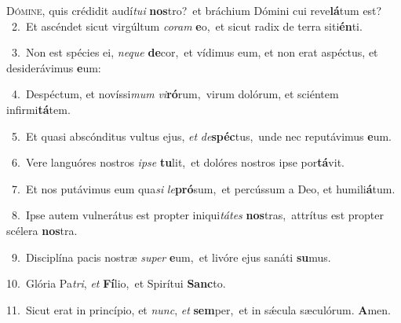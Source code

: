 \lettrine{\initial\textcolor{\initialcolor}{D}}{ómine,} quis crédidit audí\-\textit{tu}\-\textit{i} \textbf{nos}\-tro?~\star et bráchium Dómini cui reve\-\textbf{lá}\-tum est?\\
{\numbfont\textcolor{\numbcolor}{~2.}}~Et ascéndet sicut virgúltum \textit{co}\-\textit{ram} \textbf{e}\-o,~\star et sicut radix de terra siti\-\textbf{én}\-ti.\par
{\numbfont\textcolor{\numbcolor}{~3.}}~Non est spécies ei, \textit{ne}\-\textit{que} \textbf{de}\-cor,~\star et vídimus eum, et non erat aspéctus, et desiderávimus \textbf{e}\-um:\par
{\numbfont\textcolor{\numbcolor}{~4.}}~Despéctum, et novíssi\textit{mum} \textit{vi}\-\textbf{ró}rum,~\star virum dolórum, et sciéntem infirmi\-\textbf{tá}\-tem.\par
{\numbfont\textcolor{\numbcolor}{~5.}}~Et quasi abscónditus vultus ejus, \textit{et} \textit{de}\-\textbf{spéc}tus,~\star unde nec reputávimus \textbf{e}\-um.\par
{\numbfont\textcolor{\numbcolor}{~6.}}~Vere languóres nostros \textit{ip}\-\textit{se} \textbf{tu}\-lit,~\star et dolóres nostros ipse por\-\textbf{tá}\-vit.\par
{\numbfont\textcolor{\numbcolor}{~7.}}~Et nos putávimus eum qua\textit{si} \textit{le}\-\textbf{pró}sum,~\star et percússum a Deo, et humili\-\textbf{á}\-tum.\par
{\numbfont\textcolor{\numbcolor}{~8.}}~Ipse autem vulnerátus est propter iniqui\-\textit{tá}\-\textit{tes} \textbf{nos}\-tras,~\star attrítus est propter scélera \textbf{nos}\-tra.\par
{\numbfont\textcolor{\numbcolor}{~9.}}~Disciplína pacis nostræ \textit{su}\-\textit{per} \textbf{e}\-um,~\star et livóre ejus sanáti \textbf{su}\-mus.\par
{\numbfont\textcolor{\numbcolor}{10.}}~Glória Pa\-\textit{tri}\-, \textit{et} \textbf{Fí}\-lio,~\star et Spirítui \textbf{Sanc}\-to.\par
{\numbfont\textcolor{\numbcolor}{11.}}~Sicut erat in princípio, et \textit{nunc}\-, \textit{et} \textbf{sem}\-per,~\star et in sǽcula sæculórum. \textbf{A}\-men.\par
